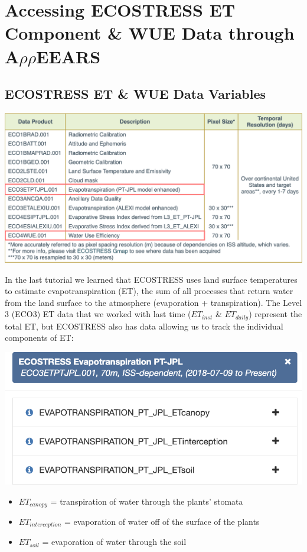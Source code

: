 \documentclass[oneside,a4paper,11pt,explicit]{book}
\begin{document}
\section{Accessing ECOSTRESS ET Component \& WUE Data through A$\rho\rho$EEARS}

\subsection{ECOSTRESS ET \& WUE Data Variables}

\vspace{.5em}

\centerline{\includegraphics[width=.75\textwidth]{ECOSTRESS_DataProducts.png}}

\vspace{.5em}

In the last tutorial we learned that ECOSTRESS uses land surface temperatures to estimate evapotranspiration (ET), the sum of all processes that return water from the land surface to the atmosphere (evaporation + transpiration). The Level 3 (ECO3) ET data that we worked with last time ($ET_{inst}$ \& $ET_{daily}$) represent the total ET, but ECOSTRESS also has data allowing us to track the individual components of ET:

\vspace{.5em}

\centerline{\includegraphics[width=.6\textwidth]{ETjplComponents.png}}

\begin{itemize}
	\item $ET_{canopy}$ = transpiration of water through the plants' stomata
	\item $ET_{interception}$ = evaporation of water off of the surface of the plants
	\item $ET_{soil}$ = evaporation of water through the soil
\end{itemize}
\end{document}
